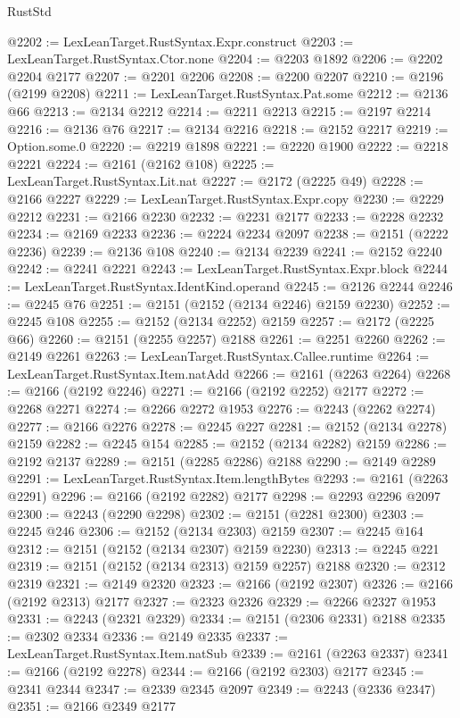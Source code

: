 \begin{lexlean}{RustStd}
\begin{coremodule}
@2202 := LexLeanTarget.RustSyntax.Expr.construct
@2203 := LexLeanTarget.RustSyntax.Ctor.none
@2204 := @2203 @1892
@2206 := @2202 @2204 @2177
@2207 := @2201 @2206
@2208 := @2200 @2207
@2210 := @2196 (@2199 @2208)
@2211 := LexLeanTarget.RustSyntax.Pat.some
@2212 := @2136 @66
@2213 := @2134 @2212
@2214 := @2211 @2213
@2215 := @2197 @2214
@2216 := @2136 @76
@2217 := @2134 @2216
@2218 := @2152 @2217
@2219 := Option.some.{0}
@2220 := @2219 @1898
@2221 := @2220 @1900
@2222 := @2218 @2221
@2224 := @2161 (@2162 @108)
@2225 := LexLeanTarget.RustSyntax.Lit.nat
@2227 := @2172 (@2225 @49)
@2228 := @2166 @2227
@2229 := LexLeanTarget.RustSyntax.Expr.copy
@2230 := @2229 @2212
@2231 := @2166 @2230
@2232 := @2231 @2177
@2233 := @2228 @2232
@2234 := @2169 @2233
@2236 := @2224 @2234 @2097
@2238 := @2151 (@2222 @2236)
@2239 := @2136 @108
@2240 := @2134 @2239
@2241 := @2152 @2240
@2242 := @2241 @2221
@2243 := LexLeanTarget.RustSyntax.Expr.block
@2244 := LexLeanTarget.RustSyntax.IdentKind.operand
@2245 := @2126 @2244
@2246 := @2245 @76
@2251 := @2151 (@2152 (@2134 @2246) @2159 @2230)
@2252 := @2245 @108
@2255 := @2152 (@2134 @2252) @2159
@2257 := @2172 (@2225 @66)
@2260 := @2151 (@2255 @2257) @2188
@2261 := @2251 @2260
@2262 := @2149 @2261
@2263 := LexLeanTarget.RustSyntax.Callee.runtime
@2264 := LexLeanTarget.RustSyntax.Item.natAdd
@2266 := @2161 (@2263 @2264)
@2268 := @2166 (@2192 @2246)
@2271 := @2166 (@2192 @2252) @2177
@2272 := @2268 @2271
@2274 := @2266 @2272 @1953
@2276 := @2243 (@2262 @2274)
@2277 := @2166 @2276
@2278 := @2245 @227
@2281 := @2152 (@2134 @2278) @2159
@2282 := @2245 @154
@2285 := @2152 (@2134 @2282) @2159
@2286 := @2192 @2137
@2289 := @2151 (@2285 @2286) @2188
@2290 := @2149 @2289
@2291 := LexLeanTarget.RustSyntax.Item.lengthBytes
@2293 := @2161 (@2263 @2291)
@2296 := @2166 (@2192 @2282) @2177
@2298 := @2293 @2296 @2097
@2300 := @2243 (@2290 @2298)
@2302 := @2151 (@2281 @2300)
@2303 := @2245 @246
@2306 := @2152 (@2134 @2303) @2159
@2307 := @2245 @164
@2312 := @2151 (@2152 (@2134 @2307) @2159 @2230)
@2313 := @2245 @221
@2319 := @2151 (@2152 (@2134 @2313) @2159 @2257) @2188
@2320 := @2312 @2319
@2321 := @2149 @2320
@2323 := @2166 (@2192 @2307)
@2326 := @2166 (@2192 @2313) @2177
@2327 := @2323 @2326
@2329 := @2266 @2327 @1953
@2331 := @2243 (@2321 @2329)
@2334 := @2151 (@2306 @2331) @2188
@2335 := @2302 @2334
@2336 := @2149 @2335
@2337 := LexLeanTarget.RustSyntax.Item.natSub
@2339 := @2161 (@2263 @2337)
@2341 := @2166 (@2192 @2278)
@2344 := @2166 (@2192 @2303) @2177
@2345 := @2341 @2344
@2347 := @2339 @2345 @2097
@2349 := @2243 (@2336 @2347)
@2351 := @2166 @2349 @2177

\end{coremodule}
\end{lexlean}
